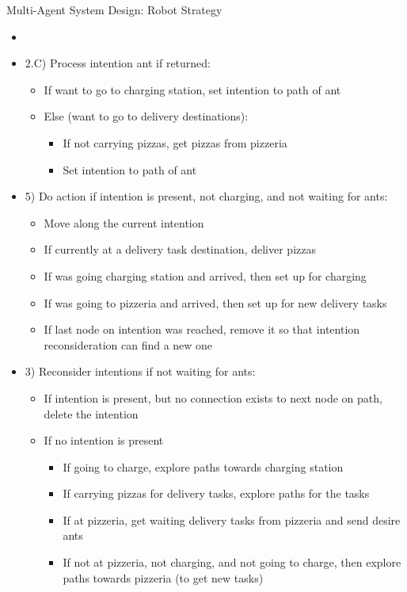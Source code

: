 \begin{frame}[allowframebreaks]{Multi-Agent System Design: Robot Strategy}
\begin{itemize}
        \item[]
        \item 2.C) Process intention ant if returned:
        \begin{itemize}
            \item If want to go to charging station, set intention to path of ant
            \item Else (want to go to delivery destinations):
            \begin{itemize}
                \item If not carrying pizzas, get pizzas from pizzeria
                \item Set intention to path of ant
            \end{itemize}
        \end{itemize}

        \framebreak

        \item 5) Do action if intention is present, not charging, and not waiting for ants:
        \begin{itemize}
            \item Move along the current intention
            \item If currently at a delivery task destination, deliver pizzas
            \item If was going charging station and arrived, then set up for charging
            \item If was going to pizzeria and arrived, then set up for new delivery tasks
            \item If last node on intention was reached, remove it so that intention reconsideration can find a new one
        \end{itemize}

        \framebreak

        \item 3) Reconsider intentions if not waiting for ants:
        \begin{itemize}
            \item If intention is present, but no connection exists to next node on path, delete the intention

            \item If no intention is present
            \begin{itemize}
                \item If going to charge, explore paths towards charging station
                \item If carrying pizzas for delivery tasks, explore paths for the tasks
                \item If at pizzeria, get waiting delivery tasks from pizzeria and send desire ants
                \item If not at pizzeria, not charging, and not going to charge, then explore paths towards pizzeria (to get new tasks)
            \end{itemize}


\end{itemize}
\end{itemize}
\end{frame}
